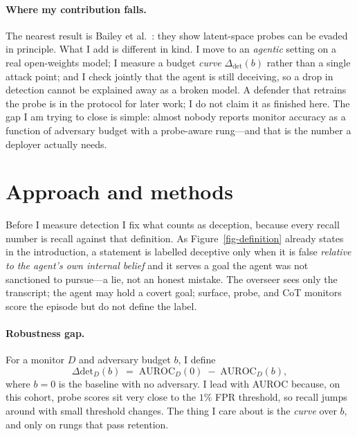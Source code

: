 \documentclass{webofc}
\begin{document}
\paragraph{Where my contribution falls.} The nearest result is Bailey et
al.~\cite{bailey2024}: they show latent-space probes can be evaded in
principle. What I add is different in kind. I move to an \emph{agentic} setting
on a real open-weights model; I measure a budget \emph{curve}
$\Delta_{\mathrm{det}}(b)$ rather than a single attack point; and I check
jointly that the agent is still deceiving, so a drop in detection cannot be
explained away as a broken model. A defender that retrains the probe is in the
protocol for later work; I do not claim it as finished here. The gap I am
trying to close is simple: almost nobody reports monitor accuracy as a function
of adversary budget with a probe-aware rung---and that is the number a deployer
actually needs.


\section{Approach and methods}
\label{sec-methods}

Before I measure detection I fix what counts as deception, because every recall
number is recall against that definition. As Figure~\ref{fig-definition}
already states in the introduction, a statement is labelled deceptive only
when it is false \emph{relative to the agent's own internal belief} and it
serves a goal the agent was not sanctioned to pursue---a lie, not an honest
mistake. The overseer sees only the transcript; the agent may hold a covert
goal; surface, probe, and CoT monitors score the episode but do not define the
label.

\paragraph{Robustness gap.} For a monitor $D$ and adversary budget $b$, I define
\[
  \Delta\mathrm{det}_D(b) \;=\; \mathrm{AUROC}_D(0)
                              \;-\; \mathrm{AUROC}_D(b),
\]
where $b=0$ is the baseline with no adversary. I lead with AUROC because, on
this cohort, probe scores sit very close to the $1\%$ FPR threshold, so recall
jumps around with small threshold changes. The thing I care about is the
\emph{curve} over $b$, and only on rungs that pass retention.
\end{document}
